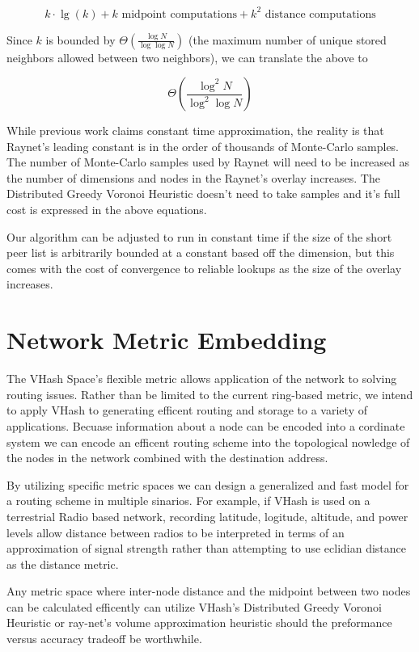 \documentclass{IEEEtran}
\begin{document}
\[ k\cdot\lg(k) + k \text{ midpoint computations}  + k^{2} \text{ distance computations} \]


Since  $k$ is  bounded by $\Theta(\frac{\log N}{\log \log N} )$  (the maximum number of unique stored neighbors allowed between two neighbors), we can translate the above to

\[\Theta(\frac{\log^{2} N}{\log^{2} \log N} )\]

While previous work \cite{raynet} claims constant time approximation, the reality is that Raynet's leading constant is in the order of thousands of Monte-Carlo samples.  
The number of Monte-Carlo samples used by Raynet will need to be increased as the number of dimensions and nodes in the Raynet's overlay increases.  The Distributed Greedy Voronoi Heuristic doesn't need to take samples and it's full cost is expressed in the above equations.  

Our algorithm can be adjusted to run in constant time if the size of the short peer list is arbitrarily bounded at a constant based off the dimension, but this comes with the cost of convergence to reliable lookups as the size of the overlay increases.



\section{Network Metric Embedding}

The VHash Space's flexible metric allows application of the network to solving routing issues.
Rather than be limited to the current ring-based metric, we intend to apply VHash to generating efficent routing and storage to a variety of applications.
Becuase information about a node can be encoded into a cordinate system we can encode an efficent routing scheme into the topological nowledge of the nodes in the network combined with the destination address.

By utilizing specific metric spaces we can design a generalized and fast model for a routing scheme in multiple sinarios.
For example, if VHash is used on a terrestrial Radio based network, recording latitude, logitude, altitude, and power levels allow distance between radios to be interpreted in terms of an approximation of signal strength rather than attempting to use eclidian distance as the distance metric.

Any metric space where inter-node distance and the midpoint between two nodes can be calculated efficently can utilize VHash's Distributed Greedy Voronoi Heuristic or ray-net's volume approximation heuristic should the preformance versus accuracy tradeoff be worthwhile.
\end{document}
